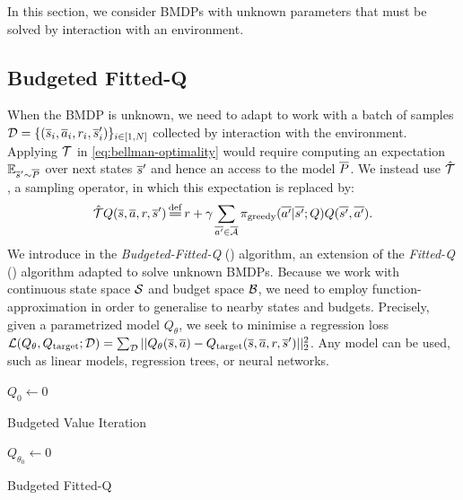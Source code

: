 \documentclass{article}
\begin{document}
In this section, we consider BMDPs with unknown parameters that must be solved by interaction with an environment. 

\subsection{Budgeted Fitted-Q}
\label{subsec:bftq}

When the BMDP is unknown, we need to adapt  to work with a batch of samples $\mathcal{D}=\{(\overline{s}_i,\overline{a}_i,r_i,\overline{s}_i')\}_{i\in [1,N]}$ collected by interaction with the environment. Applying $\mathcal{T}$ in \eqref{eq:bellman-optimality} would require computing an expectation $\operatorname*{\mathbb{E}}_{\overline{s}'\sim \overline{P}}$ over next states $\overline{s}'$ and hence an access to the model $\overline{P}$. We instead use $\hat{\mathcal{T}}$, a sampling operator, in which this expectation is replaced by:
\begin{equation*}
    \hat{\cT} Q(\os, \oa, r, \os') \eqdef r + \gamma \sum_{\ov{a'}\in \ocA} \pi_\text{greedy}(\ov{a'}|\ov{s'}; Q) Q(\ov{s'}, \ov{a'}).
\end{equation*}
We introduce in  the \emph{Budgeted-Fitted-Q} (\BFTQ) algorithm, an extension of the \emph{Fitted-Q} (\FTQ) algorithm \citep{Ernst2005,Riedmiller2005} adapted to solve unknown BMDPs. Because we work with continuous state space $\mathcal{S}$ and budget space $\mathcal{B}$, we need to employ function-approximation in order to generalise to nearby states and budgets. Precisely, given a parametrized model $Q_\theta$, we seek to minimise a regression loss $\mathcal{L}(Q_\theta, Q_\text{target};\mathcal{D}) = \sum_{\mathcal{D}} ||Q_\theta(\overline{s}, \overline{a}) - Q_\text{target}(\overline{s}, \overline{a}, r, \overline{s}')||_2^2$.
Any model can be used, such as linear models, regression trees, or neural networks.

\begin{minipage}[t]{0.47\textwidth}
\vspace{0pt}  

\begin{algorithm}[H]
\DontPrintSemicolon
{}
$Q_{0} \leftarrow 0$\;
\caption{Budgeted Value Iteration}
\label{algo:bvi}

\end{algorithm}

\end{minipage}%
\hfill
\begin{minipage}[t]{0.47\textwidth}
\vspace{0pt}

\begin{algorithm}[H]
\DontPrintSemicolon
\KwData{$\cD$}
$Q_{\theta_0} \leftarrow 0$\;
\caption{Budgeted Fitted-Q}
\label{algo:bftq}

\end{algorithm}

\end{minipage}
\end{document}

